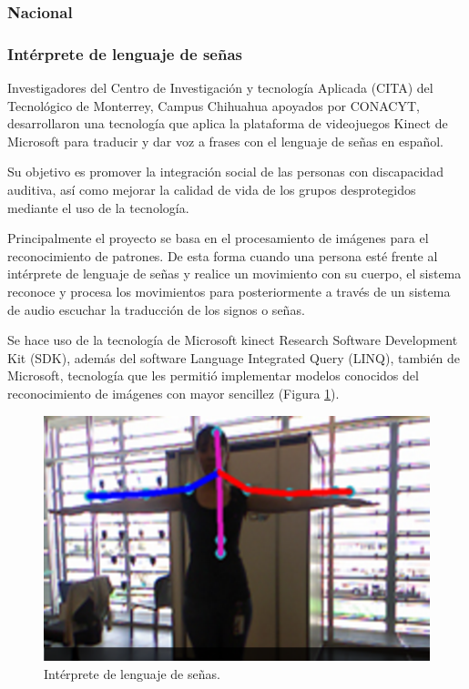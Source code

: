 	\subsubsection*{Nacional}

	\subsubsection*{Intérprete de lenguaje de señas}

	Investigadores del Centro de Investigación y tecnología Aplicada (CITA) del Tecnológico de Monterrey, Campus Chihuahua apoyados por CONACYT, desarrollaron una tecnología que aplica la plataforma de videojuegos Kinect de Microsoft para traducir y dar voz a frases con el lenguaje de señas en español.

	Su objetivo es promover la integración social de las personas con discapacidad auditiva, así como mejorar la calidad de vida de los grupos desprotegidos mediante el uso de la tecnología.

	Principalmente el proyecto se basa en el procesamiento de imágenes para el reconocimiento de patrones. De esta forma cuando una persona esté frente al intérprete de lenguaje de señas y realice un movimiento con su cuerpo, el sistema reconoce y procesa los movimientos para posteriormente a través de un sistema de audio escuchar la traducción de los signos o señas.

	Se hace uso de la tecnología de Microsoft kinect Research Software Development Kit (SDK), además del software Language Integrated Query (LINQ), también de Microsoft, tecnología que les permitió implementar modelos conocidos del reconocimiento de imágenes con mayor sencillez \cite{Bustos2012} (Figura \ref{interpreteMICROSOFT}).

		\begin{figure}[H]
			\centering
			\includegraphics[scale = 0.5]{figures/lenguajeMicrosoft}
			\caption{Intérprete de lenguaje de señas.}
			\label{interpreteMICROSOFT}
		\end{figure}

